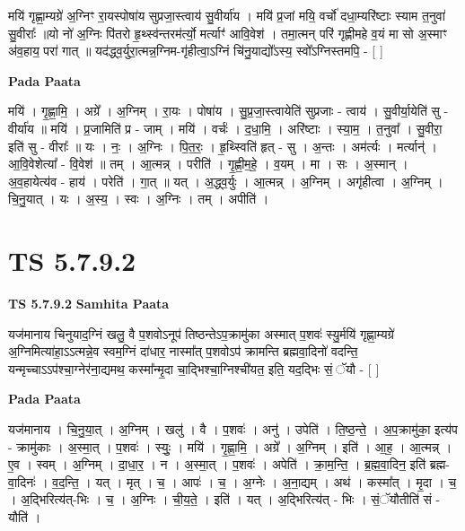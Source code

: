\documentclass[17pt]{extarticle}
\begin{document}
मयि॑ गृह्णा॒म्यग्रे॑ अ॒ग्निꣳ रा॒यस्पोषा॑य सुप्रजा॒स्त्वाय॑ सु॒वीर्या॑य । मयि॑ प्र॒जां मयि॒ वर्चो॑ दधा॒म्यरि॑ष्टाः स्याम त॒नुवा॑ सु॒वीराः᳚ ॥यो नो॑ अ॒ग्निः पि॑तरो हृ॒थ्स्व॑न्तरम॑र्त्यो॒ मर्त्याꣳ॑ आवि॒वेश॑ । तमा॒त्मन् परि॑ गृह्णीमहे व॒यं मा सो अ॒स्माꣳ अ॑व॒हाय॒ परा॑ गात् ॥ यद॑द्ध्व॒र्युरा॒त्मन्न॒ग्निम-गृ॑हीत्वा॒ऽग्निं चि॑नु॒याद्यो᳚ऽस्य॒ स्वो᳚ऽग्निस्तमपि॒ - [  ] \newline

\textbf{Pada Paata} \newline

मयि॑ । गृ॒ह्णा॒मि॒ । अग्रे᳚ । अ॒ग्निम् । रा॒यः । पोषा॑य । सु॒प्र॒जा॒स्त्वायेति॑ सुप्रजाः - त्वाय॑ । सु॒वीर्या॒येति॑ सु - वीर्या॑य ॥ मयि॑ । प्र॒जामिति॑ प्र - जाम् । मयि॑ । वर्चः॑ । द॒धा॒मि॒ । अरि॑ष्टाः । स्या॒म॒ । त॒नुवा᳚ । सु॒वीरा॒ इति॑ सु - वीराः᳚ ॥ यः । नः॒ । अ॒ग्निः । पि॒त॒रः॒ । हृ॒थ्स्विति॑ हृत् - सु । अ॒न्तः । अम॑र्त्यः । मर्त्यान्॑ । आ॒वि॒वेशेत्या᳚ - वि॒वेश॑ ॥ तम् । आ॒त्मन्न् । परीति॑ । गृ॒ह्णी॒म॒हे॒ । व॒यम् । मा । सः । अ॒स्मान् । अ॒व॒हायेत्य॑व - हाय॑ । परेति॑ । गा॒त् ॥ यत् । अ॒द्ध्व॒र्युः । आ॒त्मन्न् । अ॒ग्निम् । अगृ॑हीत्वा । अ॒ग्निम् । चि॒नु॒यात् । यः । अ॒स्य॒ । स्वः । अ॒ग्निः । तम् । अपीति॑ ।  \newline




\section*{ TS 5.7.9.2 }

\textbf{TS 5.7.9.2 } \newline
\textbf{Samhita Paata} \newline

यज॑मानाय चिनुयाद॒ग्निं खलु॒ वै प॒शवोऽनूप॑ तिष्ठन्तेऽप॒क्रामु॑का अस्मात् प॒शवः॑ स्यु॒र्मयि॑ गृह्णा॒म्यग्रे॑ अ॒ग्निमित्या॑हा॒ऽऽत्मन्ने॒व स्वम॒ग्निं दा॑धार॒ नास्मा᳚त् प॒शवोऽप॑ क्रामन्ति ब्रह्मवा॒दिनो॑ वदन्ति॒ यन्मृच्चाऽऽप॑श्चा॒ग्नेर॑ना॒द्यमथ॒ कस्मा᳚न्मृ॒दा चा॒द्भिश्चा॒ग्निश्ची॑यत॒ इति॒ यद॒द्भिः सं॒ ॅयौ - [  ] \newline

\textbf{Pada Paata} \newline

यज॑मानाय । चि॒नु॒या॒त् । अ॒ग्निम् । खलु॑ । वै । प॒शवः॑ । अनु॑ । उपेति॑ । ति॒ष्ठ॒न्ते॒ । अ॒प॒क्रामु॑का॒ इत्य॑प - क्रामु॑काः । अ॒स्मा॒त् । प॒शवः॑ । स्युः॒ । मयि॑ । गृ॒ह्णा॒मि॒ । अग्रे᳚ । अ॒ग्निम् । इति॑ । आ॒ह॒ । आ॒त्मन्न् । ए॒व । स्वम् । अ॒ग्निम् । दा॒धा॒र॒ । न । अ॒स्मा॒त् । प॒शवः॑ । अपेति॑ । क्रा॒म॒न्ति॒ । ब्र॒ह्म॒वा॒दिन॒ इति॑ ब्रह्म-वा॒दिनः॑ । व॒द॒न्ति॒ । यत् । मृत् । च॒ । आपः॑ । च॒ । अ॒ग्नेः । अ॒ना॒द्यम् । अथ॑ । कस्मा᳚त् । मृ॒दा । च॒ । अ॒द्भिरित्य॑त्-भिः । च॒ । अ॒ग्निः । ची॒य॒ते॒ । इति॑ । यत् । अ॒द्भिरित्य॑त् - भिः । सं॒ॅयौतीति॑ सं - यौति॑ ।  \newline
\end{document}
